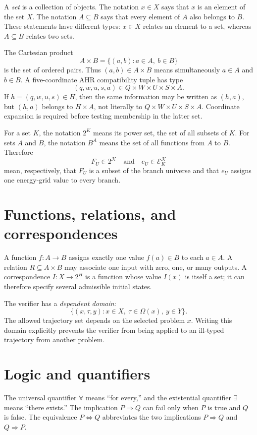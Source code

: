 \documentclass[11pt,oneside]{book}
\theoremstyle{remark}
\begin{document}
A \emph{set} is a collection of objects. The notation $x\in X$ says that
$x$ is an element of the set $X$. The notation $A\subseteq B$ says that every
element of $A$ also belongs to $B$. These statements have different types:
$x\in X$ relates an element to a set, whereas $A\subseteq B$ relates two sets.

The Cartesian product
\[
A\times B=\{(a,b):a\in A,\ b\in B\}
\]
is the set of ordered pairs. Thus $(a,b)\in A\times B$ means simultaneously
$a\in A$ and $b\in B$. A five-coordinate AHR compatibility tuple has type
\[
(q,w,u,s,a)\in Q\times W\times U\times S\times A.
\]
If $h=(q,w,u,s)\in H$, then the same information may be written as $(h,a)$,
but $(h,a)$ belongs to $H\times A$, not literally to
$Q\times W\times U\times S\times A$. Coordinate expansion is required before
testing membership in the latter set.

For a set $K$, the notation $2^K$ means its power set, the set of all subsets
of $K$. For sets $A$ and $B$, the notation $B^A$ means the set of all
functions from $A$ to $B$. Therefore
\[
F_U\in2^{\mathcal K}
\quad\text{and}\quad
e_U\in\mathcal E_K^{\mathcal K}
\]
mean, respectively, that $F_U$ is a subset of the branch universe and that
$e_U$ assigns one energy-grid value to every branch.

\section*{Functions, relations, and correspondences}

A function $f:A\to B$ assigns exactly one value $f(a)\in B$ to each
$a\in A$. A relation $R\subseteq A\times B$ may associate one input with zero,
one, or many outputs. A correspondence $I:X\to2^H$ is a function whose value
$I(x)$ is itself a set; it can therefore specify several admissible initial
states.

The verifier has a \emph{dependent domain}:
\[
\{(x,\tau,y):x\in X,\ \tau\in\Omega(x),\ y\in Y\}.
\]
The allowed trajectory set depends on the selected problem $x$. Writing this
domain explicitly prevents the verifier from being applied to an ill-typed
trajectory from another problem.

\section*{Logic and quantifiers}

The universal quantifier $\forall$ means ``for every,'' and the existential
quantifier $\exists$ means ``there exists.'' The implication
$P\Rightarrow Q$ can fail only when $P$ is true and $Q$ is false. The
equivalence $P\Longleftrightarrow Q$ abbreviates the two implications
$P\Rightarrow Q$ and $Q\Rightarrow P$.
\end{document}
